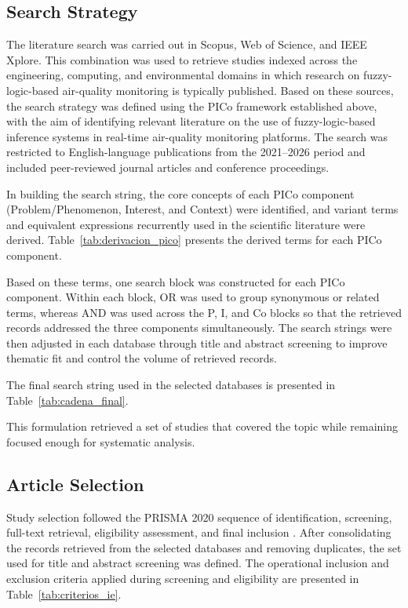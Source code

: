 \subsection*{Search Strategy}
The literature search was carried out in Scopus, Web of Science, and IEEE Xplore. This combination was used to retrieve studies indexed across the engineering, computing, and environmental domains in which research on fuzzy-logic-based air-quality monitoring is typically published. Based on these sources, the search strategy was defined using the PICo framework established above, with the aim of identifying relevant literature on the use of fuzzy-logic-based inference systems in real-time air-quality monitoring platforms. The search was restricted to English-language publications from the 2021--2026 period and included peer-reviewed journal articles and conference proceedings.

In building the search string, the core concepts of each PICo component (Problem/Phenomenon, Interest, and Context) were identified, and variant terms and equivalent expressions recurrently used in the scientific literature were derived. Table~\ref{tab:derivacion_pico} presents the derived terms for each PICo component.



Based on these terms, one search block was constructed for each PICo component. Within each block, OR was used to group synonymous or related terms, whereas AND was used across the P, I, and Co blocks so that the retrieved records addressed the three components simultaneously. The search strings were then adjusted in each database through title and abstract screening to improve thematic fit and control the volume of retrieved records.

The final search string used in the selected databases is presented in Table~\ref{tab:cadena_final}.



This formulation retrieved a set of studies that covered the topic while remaining focused enough for systematic analysis.

\subsection*{Article Selection}
Study selection followed the PRISMA 2020 sequence of identification, screening, full-text retrieval, eligibility assessment, and final inclusion \cite{prisma2020}. After consolidating the records retrieved from the selected databases and removing duplicates, the set used for title and abstract screening was defined. The operational inclusion and exclusion criteria applied during screening and eligibility are presented in Table~\ref{tab:criterios_ie}.

